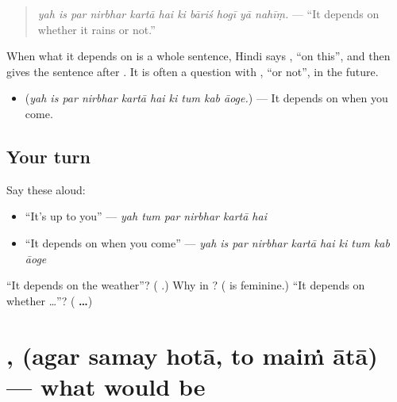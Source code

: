 \begin{quote}
\emph{yah is par nirbhar kartā hai ki bāriś hogī yā nahīṃ.} — \textquotedblleft{}It depends on whether it rains or not.\textquotedblright{}
\end{quote}

When what it depends on is a whole sentence, Hindi says \textbf{ }, \textquotedblleft{}on this\textquotedblright{}, and then gives the sentence after \textbf{}. It is often a question with \textbf{ }, \textquotedblleft{}or not\textquotedblright{}, in the future.

\begin{itemize}
\raggedright
  \item \textbf{         } (\emph{yah is par nirbhar kartā hai ki tum kab āoge.}) — It depends on when you come.
\end{itemize}

\subsection*{Your turn}
Say these aloud:

\begin{itemize}
\raggedright
  \item \textquotedblleft{}It's up to you\textquotedblright{} — \emph{yah tum par nirbhar kartā hai}
  \item \textquotedblleft{}It depends on when you come\textquotedblright{} — \emph{yah is par nirbhar kartā hai ki tum kab āoge}
\end{itemize}

\begin{tcolorbox}[breakable,colback=teal!4,colframe=teal!35!black,title={Before you move on}]
\textquotedblleft{}It depends on the weather\textquotedblright{}? (\textbf{     }.) Why \textbf{} in \textbf{      }? (\textbf{} is feminine.) \textquotedblleft{}It depends on whether …\textquotedblright{}? (\textbf{       …})
\end{tcolorbox}
\section[\texorpdfstring{\hi{अगर} \hi{समय} \hi{होता}, \hi{तो} … (agar samay hotā …)}{अगर समय होता, तो … (agar samay hotā …)}]{  ,    (agar samay hotā, to maiṁ ātā) — what would be}

